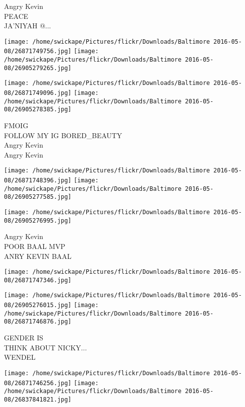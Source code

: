 \documentclass[10pt,letterpaper]{article}
\begin{document}
Angry Kevin\\
PEACE\\
JA'NIYAH @...\\
\pagebreak

\texttt{[image: /home/swickape/Pictures/flickr/Downloads/Baltimore 2016-05-08/26871749756.jpg]}
\texttt{[image: /home/swickape/Pictures/flickr/Downloads/Baltimore 2016-05-08/26905279265.jpg]}

\texttt{[image: /home/swickape/Pictures/flickr/Downloads/Baltimore 2016-05-08/26871749096.jpg]}
\texttt{[image: /home/swickape/Pictures/flickr/Downloads/Baltimore 2016-05-08/26905278385.jpg]}

FMOIG\\
FOLLOW MY IG BORED\_BEAUTY\\
Angry Kevin\\
Angry Kevin\\
\pagebreak

\texttt{[image: /home/swickape/Pictures/flickr/Downloads/Baltimore 2016-05-08/26871748396.jpg]}
\texttt{[image: /home/swickape/Pictures/flickr/Downloads/Baltimore 2016-05-08/26905277585.jpg]}

\texttt{[image: /home/swickape/Pictures/flickr/Downloads/Baltimore 2016-05-08/26905276995.jpg]}

Angry Kevin\\
POOR BAAL MVP\\
ANRY KEVIN BAAL\\
\pagebreak

\texttt{[image: /home/swickape/Pictures/flickr/Downloads/Baltimore 2016-05-08/26871747346.jpg]}

\vspace{0.25in}
\texttt{[image: /home/swickape/Pictures/flickr/Downloads/Baltimore 2016-05-08/26905276015.jpg]}
\texttt{[image: /home/swickape/Pictures/flickr/Downloads/Baltimore 2016-05-08/26871746876.jpg]}

GENDER IS\\
THINK ABOUT NICKY...\\
WENDEL\\
\pagebreak

\texttt{[image: /home/swickape/Pictures/flickr/Downloads/Baltimore 2016-05-08/26871746256.jpg]}
\texttt{[image: /home/swickape/Pictures/flickr/Downloads/Baltimore 2016-05-08/26837841821.jpg]}
\end{document}
